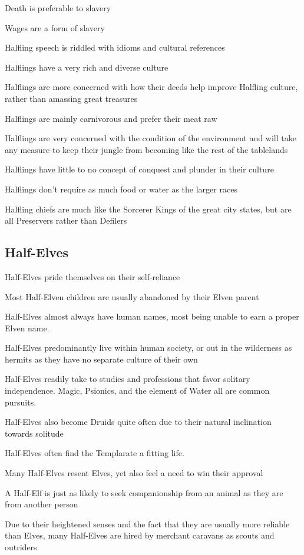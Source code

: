 \begin{description}
    \item Death is preferable to slavery
    \item Wages are a form of slavery
    \item Halfling speech is riddled with idioms and cultural references
    \item Halflings have a very rich and diverse culture
    \item Halflings are more concerned with how their deeds help improve Halfling culture, rather than amassing great treasures
    \item Halflings are mainly carnivorous and prefer their meat raw
    \item Halflings are very concerned with the condition of the environment and will take any measure to keep their jungle from becoming like the rest of the tablelands
    \item Halflings have little to no concept of conquest and plunder in their culture
    \item Halflings don’t require as much food or water as the larger races
    \item Halfling chiefs are much like the Sorcerer Kings of the great city states, but are all Preservers rather than Defilers
\end{description}

\subsection{Half-Elves}

\begin{description}
    \item Half-Elves pride themselves on their self-reliance
    \item Most Half-Elven children are usually abandoned by their Elven parent
    \item Half-Elves almost always have human names, most being unable to earn a proper Elven name.
    \item Half-Elves predominantly live within human society, or out in the wilderness as hermits as they have no separate culture of their own
    \item Half-Elves readily take to studies and professions that favor solitary independence. Magic, Psionics, and the element of Water all are common pursuits.
    \item Half-Elves also become Druids quite often due to their natural inclination towards solitude
    \item Half-Elves often find the Templarate a fitting life.
    \item Many Half-Elves resent Elves, yet also feel a need to win their approval
    \item A Half-Elf is just as likely to seek companionship from an animal as they are from another person
    \item Due to their heightened senses and the fact that they are usually more reliable than Elves, many Half-Elves are hired by merchant caravans as scouts and outriders
\end{description}

